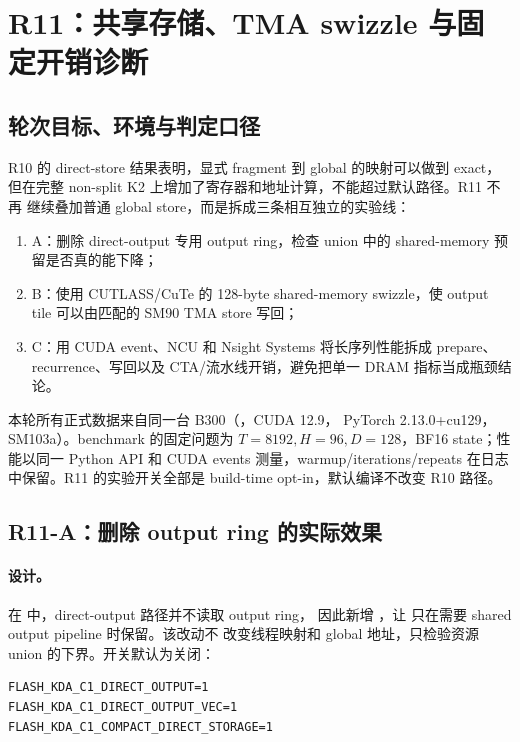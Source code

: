 \section{R11：共享存储、TMA swizzle 与固定开销诊断}

\subsection{轮次目标、环境与判定口径}

R10 的 direct-store 结果表明，显式 fragment 到 global 的映射可以做到 exact，
但在完整 non-split K2 上增加了寄存器和地址计算，不能超过默认路径。R11 不再
继续叠加普通 global store，而是拆成三条相互独立的实验线：

\begin{enumerate}
  \item A：删除 direct-output 专用 output ring，检查 union 中的 shared-memory
        预留是否真的能下降；
  \item B：使用 CUTLASS/CuTe 的 128-byte shared-memory swizzle，使 output
        tile 可以由匹配的 SM90 TMA store 写回；
  \item C：用 CUDA event、NCU 和 Nsight Systems 将长序列性能拆成 prepare、
        recurrence、写回以及 CTA/流水线开销，避免把单一 DRAM 指标当成瓶颈结论。
\end{enumerate}

本轮所有正式数据来自同一台 B300（，CUDA 12.9，
PyTorch 2.13.0+cu129，SM103a）。benchmark 的固定问题为
\(T=8192,H=96,D=128\)，BF16 state；性能以同一 Python API 和 CUDA events
测量，warmup/iterations/repeats 在日志中保留。R11 的实验开关全部是 build-time
opt-in，默认编译不改变 R10 路径。

\subsection{R11-A：删除 output ring 的实际效果}

\paragraph{设计。}
在  中，direct-output 路径并不读取 output ring，
因此新增 ，让
 只在需要 shared output pipeline 时保留。该改动不
改变线程映射和 global 地址，只检验资源 union 的下界。开关默认为关闭：

\begin{lstlisting}
FLASH_KDA_C1_DIRECT_OUTPUT=1
FLASH_KDA_C1_DIRECT_OUTPUT_VEC=1
FLASH_KDA_C1_COMPACT_DIRECT_STORAGE=1
\end{lstlisting}

